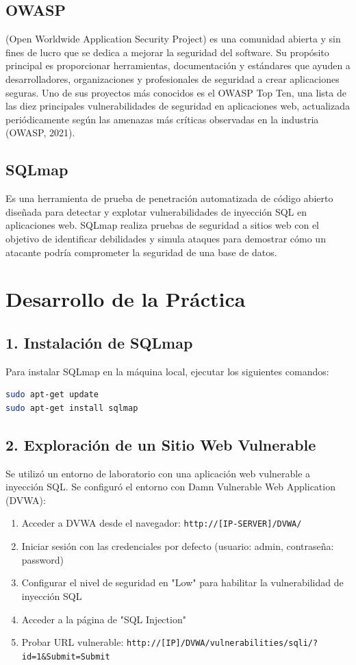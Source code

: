 \documentclass[12pt,a4paper]{article}
\begin{document}
\subsection{OWASP}
(Open Worldwide Application Security Project) es una comunidad abierta y sin fines de lucro que se dedica a mejorar la seguridad del software. Su propósito principal es proporcionar herramientas, documentación y estándares que ayuden a desarrolladores, organizaciones y profesionales de seguridad a crear aplicaciones seguras. Uno de sus proyectos más conocidos es el OWASP Top Ten, una lista de las diez principales vulnerabilidades de seguridad en aplicaciones web, actualizada periódicamente según las amenazas más críticas observadas en la industria (OWASP, 2021).

\subsection{SQLmap}
Es una herramienta de prueba de penetración automatizada de código abierto diseñada para detectar y explotar vulnerabilidades de inyección SQL en aplicaciones web. SQLmap realiza pruebas de seguridad a sitios web con el objetivo de identificar debilidades y simula ataques para demostrar cómo un atacante podría comprometer la seguridad de una base de datos.

\section{Desarrollo de la Práctica}
\subsection{1. Instalación de SQLmap}
Para instalar SQLmap en la máquina local, ejecutar los siguientes comandos:

\begin{lstlisting}[language=bash, caption=Instalación de SQLmap en Linux]
sudo apt-get update
sudo apt-get install sqlmap
\end{lstlisting}

\subsection{2. Exploración de un Sitio Web Vulnerable}
Se utilizó un entorno de laboratorio con una aplicación web vulnerable a inyección SQL. Se configuró el entorno con Damn Vulnerable Web Application (DVWA):

\begin{enumerate}
    \item Acceder a DVWA desde el navegador: \texttt{http://[IP-SERVER]/DVWA/}
    \item Iniciar sesión con las credenciales por defecto (usuario: admin, contraseña: password)
    \item Configurar el nivel de seguridad en "Low" para habilitar la vulnerabilidad de inyección SQL
    \item Acceder a la página de "SQL Injection"
    \item Probar URL vulnerable: \texttt{http://[IP]/DVWA/vulnerabilities/sqli/?id=1\&Submit=Submit}
\end{enumerate}
\end{document}
